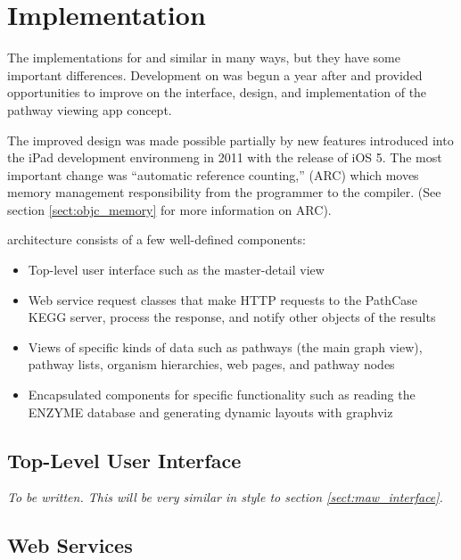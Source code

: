 \section{Implementation}
\label{sect:kegg_implementation}

The implementations for \mawapp and \keggapp similar in many ways, but they have
some important differences. Development on \keggapp was begun a year after
\mawapp and provided opportunities to improve on the interface, design, and
implementation of the pathway viewing app concept.

The improved design was made possible partially by new features introduced into
the iPad development environmeng in 2011 with the release of iOS 5. The most
important change was ``automatic reference counting,'' (ARC) which moves memory
management responsibility from the programmer to the compiler. (See section
\ref{sect:objc_memory} for more information on ARC).

\keggappp architecture consists of a few well-defined components:

\begin{itemize}

    \item Top-level user interface such as the master-detail view
    
    \item Web service request classes that make HTTP requests to the PathCase
        KEGG server, process the response, and notify other objects of the
        results

    \item Views of specific kinds of data such as pathways (the main graph
        view), pathway lists, organism hierarchies, web pages, and pathway nodes

    \item Encapsulated components for specific functionality such as reading the
        ENZYME database and generating dynamic layouts with graphviz

\end{itemize}

\subsection{Top-Level User Interface}
\label{sect:kegg_impl_top_level_ui}

\emph{To be written. This will be very similar in style to section
\ref{sect:maw_interface}.}

\subsection{Web Services}
\label{sect:kegg_impl_web_services}


